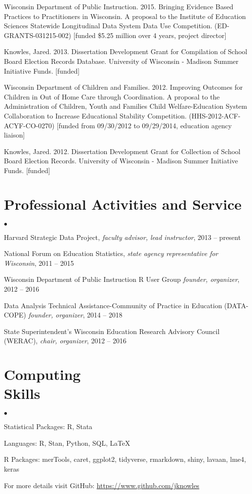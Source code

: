 \documentclass[margin,line]{res}
\newenvironment{list2}{
  \begin{list}{$\bullet$}{%
      \setlength{\itemsep}{0in}
      \setlength{\parsep}{0in} \setlength{\parskip}{0in}
      \setlength{\topsep}{0in} \setlength{\partopsep}{0in} 
      \setlength{\leftmargin}{0.2in}}}{\end{list}}
\begin{document}
\begin{resume}
Wisconsin Department of Public Instruction. 2015. Bringing Evidence Based 
Practices to Practitioners in Wisconsin. A proposal to the Institute of Education 
Sciences Statewide Longitudinal Data System Data Use Competition. (ED-GRANTS-031215-002) 
[funded \$5.25 million over 4 years, project director]

Knowles, Jared. 2013. Dissertation Development Grant for Compilation of School Board Election Records Database. University of Wisconsin - Madison Summer Initiative Funds. [funded]

Wisconsin Department of Children and Families. 2012. Improving Outcomes for Children in Out of Home Care through Coordination. A proposal to the Administration of Children, Youth and Families 
 Child Welfare-Education System Collaboration to Increase Educational Stability Competition. (HHS-2012-ACF-ACYF-CO-0270) [funded from 09/30/2012 to 09/29/2014, education agency liaison]

Knowles, Jared. 2012. Dissertation Development Grant for Collection of School Board Election Records. University of Wisconsin - Madison Summer Initiative Funds. [funded]

\section{\sc Professional Activities and Service}

\begin{list2}
\item Harvard Strategic Data Project, \emph{faculty advisor, lead instructor}, 2013 -- present
\item National Forum on Education Statistics, \emph{state agency representative for Wisconsin}, 
2011 -- 2015
\item Wisconsin Department of Public Instruction R User Group \emph{founder, organizer}, 
2012 -- 2016 
\item Data Analysis Technical Assistance-Community of Practice in Education 
(DATA-COPE) \emph{founder, organizer}, 2014 -- 2018
\item State Superintendent's Wisconsin Education Research Advisory Council (WERAC), 
\emph{chair, organizer}, 2012 -- 2016
\end{list2}
 
\section{\sc Computing \\ Skills} 
\begin{list2}
\item Statistical Packages: R, Stata
\item Languages:  R, Stan, Python, SQL, \LaTeX
\item R Packages: merTools, caret, ggplot2, tidyverse, rmarkdown, shiny, lavaan, lme4, keras
\item For more details visit GitHub: \url{https://www.github.com/jknowles}\\
\end{list2}


\end{resume}
\end{document}
